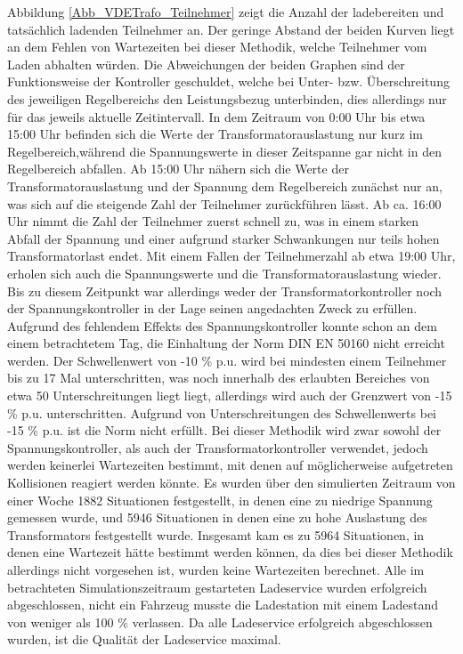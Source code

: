 Abbildung \ref{Abb_VDETrafo_Teilnehmer} zeigt die Anzahl der ladebereiten und tatsächlich ladenden Teilnehmer an. Der geringe Abstand der beiden Kurven liegt an dem Fehlen von Wartezeiten bei dieser Methodik, welche Teilnehmer vom Laden abhalten würden. Die Abweichungen der beiden Graphen sind der Funktionsweise der Kontroller geschuldet, welche bei Unter- bzw. Überschreitung des jeweiligen Regelbereichs den Leistungsbezug unterbinden, dies allerdings nur für das jeweils aktuelle Zeitintervall. 
In dem Zeitraum von 0:00 Uhr bis etwa 15:00 Uhr befinden sich die Werte der Transformatorauslastung nur kurz im Regelbereich,während die Spannungswerte in dieser Zeitspanne gar nicht in den Regelbereich abfallen. Ab 15:00 Uhr nähern sich die Werte der Transformatorauslastung und der Spannung dem Regelbereich zunächst nur an, was sich auf die steigende Zahl der Teilnehmer zurückführen lässt. Ab ca. 16:00 Uhr nimmt die Zahl der Teilnehmer zuerst schnell zu, was in einem starken Abfall der Spannung und einer aufgrund starker Schwankungen nur teils hohen Transformatorlast endet. Mit einem Fallen der Teilnehmerzahl ab etwa 19:00 Uhr, erholen sich auch die Spannungswerte und die Transformatorauslastung wieder. Bis zu diesem Zeitpunkt war allerdings weder der Transformatorkontroller noch der Spannungskontroller in der Lage seinen angedachten Zweck zu erfüllen.
Aufgrund des fehlendem Effekts des Spannungskontroller konnte schon an dem einem betrachtetem Tag, die Einhaltung der Norm DIN EN 50160 nicht erreicht werden. Der Schwellenwert von -10 \% p.u. wird bei mindesten einem Teilnehmer bis zu 17 Mal unterschritten, was noch innerhalb des erlaubten Bereiches von etwa 50 Unterschreitungen liegt liegt, allerdings wird auch der Grenzwert von -15 \% p.u. unterschritten. Aufgrund von Unterschreitungen des Schwellenwerts bei -15 \% p.u. ist die Norm nicht erfüllt.
Bei dieser Methodik wird zwar sowohl der Spannungskontroller, als auch der Transformatorkontroller verwendet, jedoch werden keinerlei Wartezeiten bestimmt, mit denen auf möglicherweise aufgetreten Kollisionen reagiert werden könnte. Es wurden über den simulierten Zeitraum von einer Woche 1882 Situationen festgestellt, in denen eine zu niedrige Spannung gemessen wurde, und 5946 Situationen in denen eine zu hohe Auslastung des Transformators festgestellt wurde. Insgesamt kam es zu 5964 Situationen, in denen eine Wartezeit hätte bestimmt werden können, da dies bei dieser Methodik allerdings nicht vorgesehen ist, wurden keine Wartezeiten berechnet.
Alle im betrachteten Simulationszeitraum gestarteten Ladeservice wurden erfolgreich abgeschlossen, nicht ein Fahrzeug musste die Ladestation mit einem Ladestand von weniger als 100 \% verlassen. Da alle Ladeservice erfolgreich abgeschlossen wurden, ist die Qualität der Ladeservice maximal.
